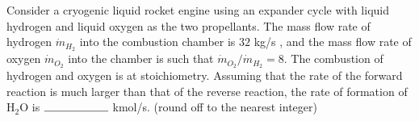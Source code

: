 	\item Consider a cryogenic liquid rocket engine using an expander cycle with liquid hydrogen and liquid oxygen as the two propellants. The mass flow rate of hydrogen $\dot{m}_{H_2}$ into the combustion chamber is $32$ kg/s , and the mass flow rate of oxygen $\dot{m}_{O_2}$ into the chamber is such that $\dot{m}_{O_2}/\dot{m}_{H_2}=8$. The combustion of hydrogen and oxygen is at stoichiometry. Assuming that the rate of the forward reaction is much larger than that of the reverse reaction, the rate of formation of $\text{H}_2$O is $\rule{2cm}{0.4pt}$ kmol/s. (round off to the nearest integer)

